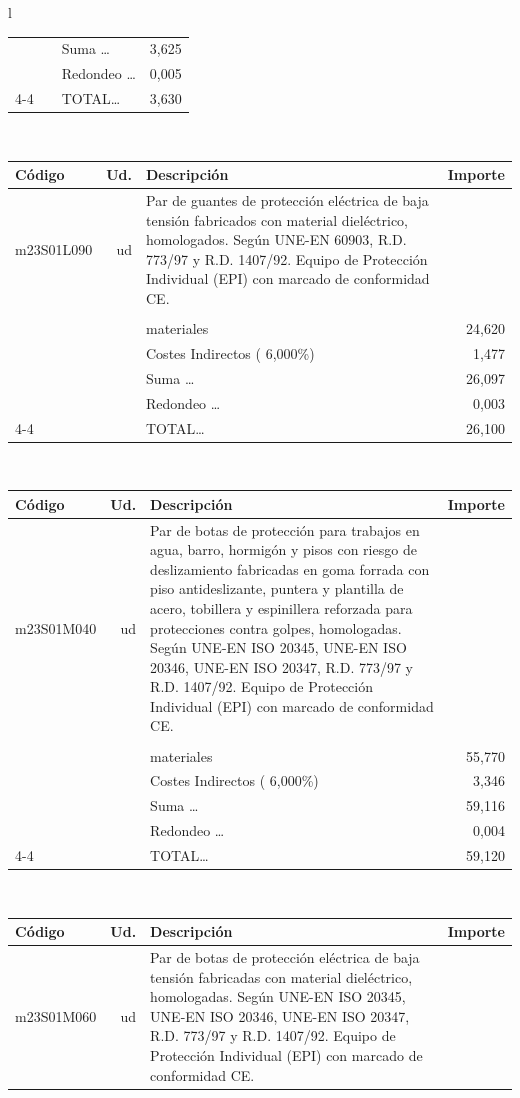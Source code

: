\documentclass{book}%
\begin{document}
\begin{longtable}{l}
\begin{tabular}{l r p{60mm} r}
&&Suma \ldots&     3,625\\%
&&Redondeo \ldots&     0,005\\%
\cline{4-4}%
&&TOTAL\ldots&     3,630\\%
\end{tabular}\\%
\begin{tabular}{l r p{60mm} r}%
Código&Ud.&Descripción&Importe\\%
\hline%
m23S01L090&ud&Par de guantes de protección eléctrica de baja tensión fabricados con material dieléctrico, homologados. Según UNE{-}EN 60903, R.D. 773/97 y R.D. 1407/92. Equipo de Protección Individual (EPI) con marcado de conformidad CE.&\\%
&&&\\%
&&materiales&    24,620\\%
&&Costes Indirectos (     6,000\%)&     1,477\\%
&&Suma \ldots&    26,097\\%
&&Redondeo \ldots&     0,003\\%
\cline{4-4}%
&&TOTAL\ldots&    26,100\\%
\end{tabular}\\%
\begin{tabular}{l r p{60mm} r}%
Código&Ud.&Descripción&Importe\\%
\hline%
m23S01M040&ud&Par de botas de protección para trabajos en agua, barro, hormigón y pisos con riesgo de deslizamiento fabricadas en goma forrada con piso antideslizante, puntera y plantilla de acero, tobillera y espinillera reforzada para protecciones contra golpes, homologadas. Según UNE{-}EN ISO 20345, UNE{-}EN ISO 20346, UNE{-}EN ISO 20347, R.D. 773/97 y R.D. 1407/92. Equipo de Protección Individual (EPI) con marcado de conformidad CE.&\\%
&&&\\%
&&materiales&    55,770\\%
&&Costes Indirectos (     6,000\%)&     3,346\\%
&&Suma \ldots&    59,116\\%
&&Redondeo \ldots&     0,004\\%
\cline{4-4}%
&&TOTAL\ldots&    59,120\\%
\end{tabular}\\%
\begin{tabular}{l r p{60mm} r}%
Código&Ud.&Descripción&Importe\\%
\hline%
m23S01M060&ud&Par de botas de protección eléctrica de baja tensión fabricadas con material dieléctrico, homologadas. Según UNE{-}EN ISO 20345, UNE{-}EN ISO 20346, UNE{-}EN ISO 20347, R.D. 773/97 y R.D. 1407/92. Equipo de Protección Individual (EPI) con marcado de conformidad CE.&\\%

\end{tabular}
\end{longtable}
\end{document}
